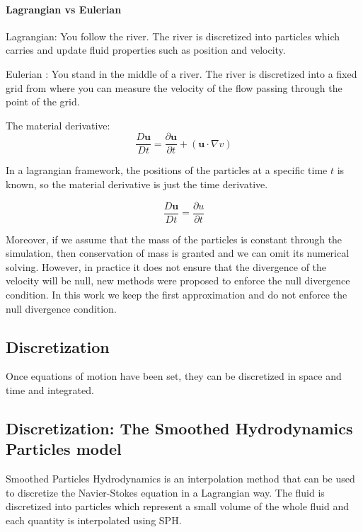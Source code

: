 \documentclass[11pt, oneside, a4paper]{memoir}
\begin{document}
\paragraph{Lagrangian vs Eulerian}

Lagrangian: You follow the river. The river is discretized into particles which carries and update fluid properties such as position and velocity. 

Eulerian : You stand in the middle of a river. The river is discretized into a fixed grid from where you can measure the velocity of the flow passing through the point of the grid.

The material derivative:
\begin{equation}
\frac{D\mathbf{u}}{Dt} = \frac{\partial \mathbf{u}}{\partial t} + (\mathbf{u} \cdot \nabla v)
\end{equation}

In a lagrangian framework, the positions of the particles at a specific time $t$ is known, so the material derivative is just the time derivative.

\begin{equation}
\frac{D\mathbf{u}}{Dt} = \frac{\partial u}{\partial t}
\end{equation}

Moreover, if we assume that the mass of the particles is constant through the simulation, then conservation of mass is granted and we can omit its numerical solving. However, in practice it does not ensure that the divergence of the velocity will be null, new methods were proposed to enforce the null divergence condition. In this work we keep the first approximation and do not enforce the null divergence condition.

\subsection{Discretization}

Once equations of motion have been set, they can be discretized in space and time and integrated.

\subsection{Discretization: The Smoothed Hydrodynamics Particles model}
Smoothed Particles Hydrodynamics is an interpolation method that can be used to discretize the Navier-Stokes equation in a Lagrangian way. The fluid is discretized into particles which represent a small volume of the whole fluid and each quantity is interpolated using SPH.
\end{document}
